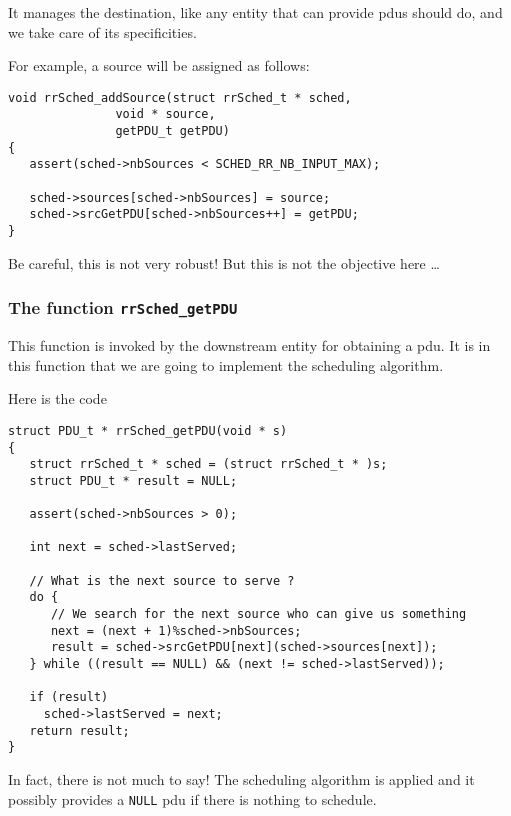     It manages the destination, like any entity that can provide
{\sc pdu}s should do, and we take care of its specificities.

    For example, a source will be assigned as follows:

\begin{verbatim}
void rrSched_addSource(struct rrSched_t * sched,
		       void * source,
		       getPDU_t getPDU)
{
   assert(sched->nbSources < SCHED_RR_NB_INPUT_MAX);

   sched->sources[sched->nbSources] = source;
   sched->srcGetPDU[sched->nbSources++] = getPDU;
}
\end{verbatim}

   Be careful, this is not very robust! But this is not the objective
here \ldots

%
\subsubsection{The function {\tt rrSched\_getPDU}}
 
   This function is invoked by the downstream entity for
obtaining a {\sc pdu}. It is in this function that we are going to
implement the scheduling algorithm.

    Here is the code

\begin{verbatim}
struct PDU_t * rrSched_getPDU(void * s)
{
   struct rrSched_t * sched = (struct rrSched_t * )s;
   struct PDU_t * result = NULL;

   assert(sched->nbSources > 0);

   int next = sched->lastServed;

   // What is the next source to serve ?
   do {
      // We search for the next source who can give us something
      next = (next + 1)%sched->nbSources;
      result = sched->srcGetPDU[next](sched->sources[next]);
   } while ((result == NULL) && (next != sched->lastServed));

   if (result)
     sched->lastServed = next;
   return result;
}
\end{verbatim}

   
   In fact, there is not much to say! The scheduling algorithm is applied and it possibly provides a {\tt NULL} {\sc pdu} if there is nothing to schedule.

